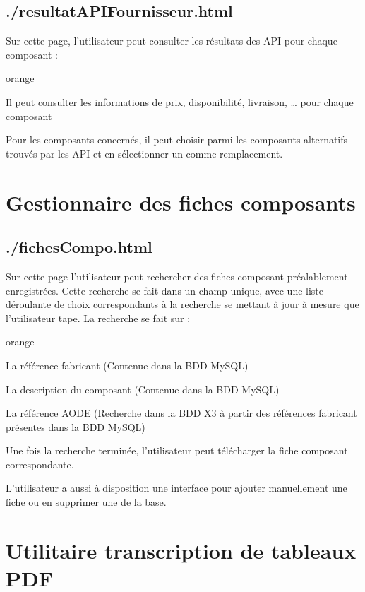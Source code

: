 {\subsection{./resultatAPIFournisseur.html}

Sur cette page, l’utilisateur peut consulter les résultats des API pour chaque composant :

\begin{items}{orange}{\Triangle}
\item Il peut consulter les informations de prix, disponibilité, livraison, … pour chaque composant 
\item Pour les composants concernés, il peut choisir parmi les composants alternatifs trouvés par les API et en sélectionner un comme remplacement.
\end{items}

\section{Gestionnaire des fiches composants}

\subsection{./fichesCompo.html}

Sur cette page l’utilisateur peut rechercher des fiches composant préalablement enregistrées. Cette recherche se fait dans un champ unique, avec une liste déroulante de choix correspondants à la recherche se mettant à jour à mesure que l’utilisateur tape. La recherche se fait sur :

\begin{items}{orange}{\Triangle}
\item La référence fabricant (Contenue dans la BDD MySQL)
\item La description du composant (Contenue dans la BDD MySQL)
\item La référence AODE (Recherche dans la BDD X3 à partir des références fabricant présentes dans la BDD MySQL)
\end{items}

Une fois la recherche terminée, l’utilisateur peut télécharger la fiche composant correspondante.

L’utilisateur a aussi à disposition une interface pour ajouter manuellement une fiche ou en supprimer une de la base.


\section{Utilitaire transcription de tableaux PDF}

}
